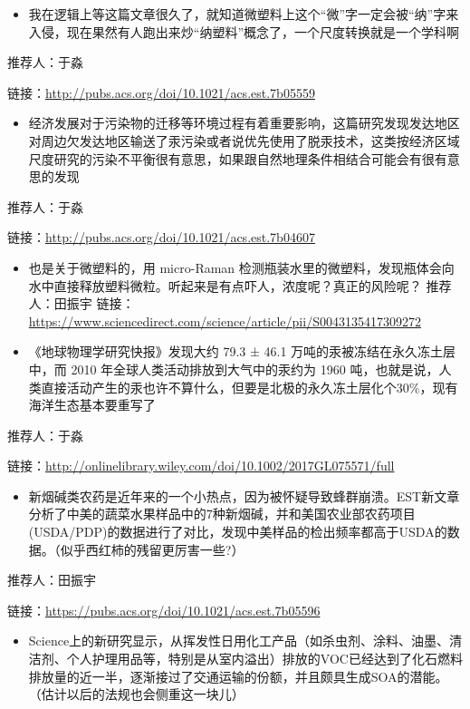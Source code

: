 \documentclass[]{book}
\providecommand{\tightlist}{%
  \setlength{\itemsep}{0pt}\setlength{\parskip}{0pt}}
\begin{document}
\begin{itemize}
\tightlist
\item
  我在逻辑上等这篇文章很久了，就知道微塑料上这个``微''字一定会被``纳''字来入侵，现在果然有人跑出来炒``纳塑料''概念了，一个尺度转换就是一个学科啊
\end{itemize}

推荐人：于淼

链接：\url{http://pubs.acs.org/doi/10.1021/acs.est.7b05559}

\begin{itemize}
\tightlist
\item
  经济发展对于污染物的迁移等环境过程有着重要影响，这篇研究发现发达地区对周边欠发达地区输送了汞污染或者说优先使用了脱汞技术，这类按经济区域尺度研究的污染不平衡很有意思，如果跟自然地理条件相结合可能会有很有意思的发现
\end{itemize}

推荐人：于淼

链接：\url{http://pubs.acs.org/doi/10.1021/acs.est.7b04607}

\begin{itemize}
\item
  也是关于微塑料的，用 micro-Raman
  检测瓶装水里的微塑料，发现瓶体会向水中直接释放塑料微粒。听起来是有点吓人，浓度呢？真正的风险呢？
  推荐人：田振宇
  链接：\url{https://www.sciencedirect.com/science/article/pii/S0043135417309272}
\item
  《地球物理学研究快报》发现大约 79.3 ± 46.1
  万吨的汞被冻结在永久冻土层中，而 2010
  年全球人类活动排放到大气中的汞约为 1960
  吨，也就是说，人类直接活动产生的汞也许不算什么，但要是北极的永久冻土层化个30\%，现有海洋生态基本要重写了
\end{itemize}

推荐人：于淼

链接：\url{http://onlinelibrary.wiley.com/doi/10.1002/2017GL075571/full}

\begin{itemize}
\tightlist
\item
  新烟碱类农药是近年来的一个小热点，因为被怀疑导致蜂群崩溃。EST新文章分析了中美的蔬菜水果样品中的7种新烟碱，并和美国农业部农药项目(USDA/PDP)的数据进行了对比，发现中美样品的检出频率都高于USDA的数据。（似乎西红柿的残留更厉害一些?）
\end{itemize}

推荐人：田振宇

链接：\url{https://pubs.acs.org/doi/10.1021/acs.est.7b05596}

\begin{itemize}
\tightlist
\item
  Science上的新研究显示，从挥发性日用化工产品（如杀虫剂、涂料、油墨、清洁剂、个人护理用品等，特别是从室内溢出）排放的VOC已经达到了化石燃料排放量的近一半，逐渐接过了交通运输的份额，并且颇具生成SOA的潜能。（估计以后的法规也会侧重这一块儿）
\end{itemize}
\end{document}
